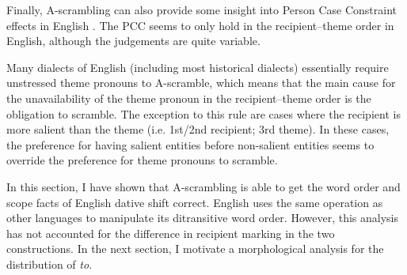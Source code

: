 \begin{exe}
\end{exe}

Finally, A-scrambling can also provide some insight into Person Case Constraint effects in English \citep{Haspelmath.2004}. The PCC seems to only hold in the recipient--theme order in English, although the judgements are quite variable.

\begin{exe}
\ex \cite[ex 29]{Haspelmath.2004}
\begin{xlist}
\end{xlist}
\ex 
\begin{xlist}
\end{xlist}
\end{exe}

Many dialects of English (including most historical dialects) essentially require unstressed theme pronouns to A-scramble, which means that the main cause for the unavailability of the theme pronoun in the recipient--theme order is the obligation to scramble. The exception to this rule are cases where the recipient is more salient than the theme (i.e. 1st/2nd recipient; 3rd theme). In these cases, the preference for having salient entities before non-salient entities seems to override the preference for theme pronouns to scramble.

In this section, I have shown that A-scrambling is able to get the word order and scope facts of English dative shift correct. English uses the same operation as other languages to manipulate its ditransitive word order. However, this analysis has not accounted for the difference in recipient marking in the two constructions. In the next section, I motivate a morphological analysis for the distribution of \textit{to}.

